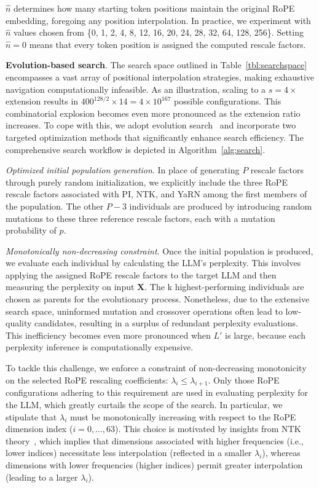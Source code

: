 $\hat{n}$ determines how many starting token positions maintain the original RoPE embedding, foregoing any position interpolation. In practice, we experiment with $\hat{n}$ values chosen from \{0, 1, 2, 4, 8, 12, 16, 20, 24, 28, 32, 64, 128, 256\}. Setting $\hat{n}=0$ means that every token position is assigned the computed rescale factors.

\textbf{Evolution-based search}. The search space outlined in Table~\ref{tbl:searchspace} encompasses a vast array of positional interpolation strategies, making exhaustive navigation computationally infeasible. As an illustration, scaling to a $s=4\times$ extension results in $400^{128/2}\times14 = 4\times10^{167}$ possible configurations. This combinatorial explosion becomes even more pronounced as the extension ratio increases. To cope with this, we adopt evolution search~\cite{guo2020single} and incorporate two targeted optimization methods that significantly enhance search efficiency. The comprehensive search workflow is depicted in Algorithm~\ref{alg:search}.

\textit{Optimized initial population generation}. In place of generating $P$ rescale factors through purely random initialization, we explicitly include the three RoPE rescale factors associated with PI, NTK, and YaRN among the first members of the population. The other $P-3$ individuals are produced by introducing random mutations to these three reference rescale factors, each with a mutation probability of $p$.

\textit{Monotonically non-decreasing constraint}. Once the initial population is produced, we evaluate each individual by calculating the LLM's perplexity. This involves applying the assigned RoPE rescale factors to the target LLM and then measuring the perplexity on input $\mathbf{X}$. The k highest-performing individuals are chosen as parents for the evolutionary process. Nonetheless, due to the extensive search space, uninformed mutation and crossover operations often lead to low-quality candidates, resulting in a surplus of redundant perplexity evaluations. This inefficiency becomes even more pronounced when $L'$ is large, because each perplexity inference is computationally expensive.

To tackle this challenge, we enforce a constraint of non-decreasing monotonicity on the selected RoPE rescaling coefficients: $\lambda_i \le \lambda_{i+1}$. Only those RoPE configurations adhering to this requirement are used in evaluating perplexity for the LLM, which greatly curtails the scope of the search. In particular, we stipulate that $\lambda_i$ must be monotonically increasing with respect to the RoPE dimension index ($i=0,\dots,63$). This choice is motivated by insights from NTK theory~\cite{jacot2018neural,tancik2020fourier,ntk}, which implies that dimensions associated with higher frequencies (i.e., lower indices) necessitate less interpolation (reflected in a smaller $\lambda_i$), whereas dimensions with lower frequencies (higher indices) permit greater interpolation (leading to a larger $\lambda_i$).

